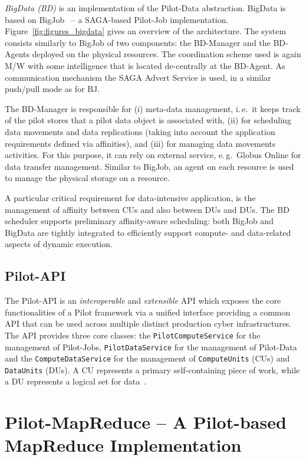 \documentclass{acm_proc_article-sp}
\newcommand{\alnote}[1]{ {\textcolor{blue} { ***andreL: #1 }}}
\newcommand{\alnote}[1]{}
\newcommand{\pilot}{Pilot\xspace}
\begin{document}
{\it BigData (BD)} is an implementation of the Pilot-Data abstraction.
BigData is based on BigJob~\cite{bigjob_web} -- a SAGA-based Pilot-Job
implementation. Figure~\ref{fig:figures_bigdata} gives an overview of the
architecture. The system consists similarly to BigJob of two components: the
BD-Manager and the BD-Agents deployed on the physical resources. The
coordination scheme used is again M/W with some intelligence that is located
de-centrally at the BD-Agent. As communication mechanism the SAGA Advert
Service is used, in a similar push/pull mode as for BJ.

The BD-Manager is responsible for (i) meta-data management, i.\,e.\ it
keeps track of the pilot stores that a pilot data object is associated
with, (ii) for scheduling data movements and data replications (taking
into account the application requirements defined via affinities), and
(iii) for managing data movements activities. For this purpose, it can rely
on external service, e.\,g.\ Globus Online for data transfer management.  
Similar to BigJob, an agent on each resource is used to manage the physical 
storage on a resource.  

A particular critical requirement for data-intensive application, is
the management of affinity between CUs and also between DUs and
DUs. The BD scheduler supports preliminary affinity-aware
scheduling: both BigJob and BigData are tightly integrated to
efficiently support compute- and data-related aspects of dynamic
execution. 

\subsection{Pilot-API}

The Pilot-API is an {\it interoperable} and {\it extensible} API which exposes the core functionalities
of a \pilot framework via a unified interface providing a common API that can be used across multiple 
distinct production cyber infrastructures.
 The API provides three core classes: the
\texttt{PilotComputeService} for the management of Pilot-Jobs,
\texttt{PilotDataService} for the management of Pilot-Data and the
\texttt{ComputeDataService} for the management of \texttt{ComputeUnits} (CUs)
and \texttt{DataUnits} (DUs). A CU represents a primary self-containing piece
of work, while a DU represents a logical set for data~\cite{pstar-2012}.

\section{Pilot-MapReduce -- A Pilot-based MapReduce Implementation}
\label{sec-pilot-mr}
\end{document}
